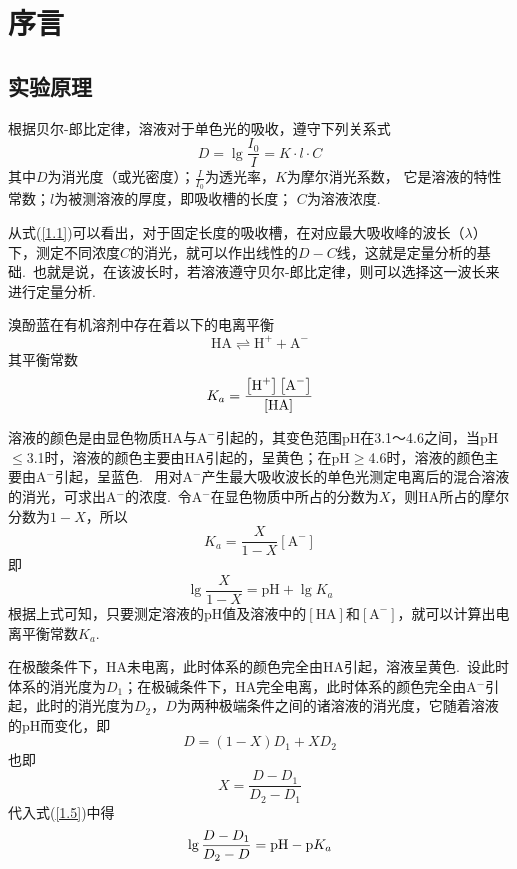 
\chapter{序言}

\section{实验原理\cite{huaxe23}}
根据贝尔-郎比定律，溶液对于单色光的吸收，遵守下列关系式
\begin{equation}\label{1.1}
  D=\lg\frac{I_0}{I}=K\cdot l\cdot C
\end{equation}
其中$D$为消光度（或光密度）；$\frac{I}{I_0}$为透光率，$K$为摩尔消光系数，
它是溶液的特性常数；$l$为被测溶液的厚度，即吸收槽的长度；
$C$为溶液浓度.~

从式(\ref{1.1})可以看出，对于固定长度的吸收槽，在对应最大吸收峰的波长（$\lambda$）下，测定不同浓度$C$的消光，就可以作出线性的$D-C$线，这就是定量分析的基础.~也就是说，在该波长时，若溶液遵守贝尔-郎比定律，则可以选择这一波长来进行定量分析.~

溴酚蓝在有机溶剂中存在着以下的电离平衡
\begin{equation}
  \text{HA}\rightleftharpoons \text{H}^++\text{A}^-
\end{equation}
其平衡常数
\begin{equation}
  K_a=\frac{\left[\text H^+\right]\left[\text A^-\right]}{\left[\text{HA}\right]}
\end{equation}

溶液的颜色是由显色物质HA与$\text{A}^-$引起的，其变色范围pH在3.1～4.6之间，当pH$\leqslant $3.1时，溶液的颜色主要由HA引起的，呈黄色；在pH$\geqslant $4.6时，溶液的颜色主要由A$^-$引起，呈蓝色.~
用对A$^-$产生最大吸收波长的单色光测定电离后的混合溶液的消光，可求出A$^-$的浓度.~令A$^-$在显色物质中所占的分数为$X$，则HA所占的摩尔分数为$1-X$，所以
\begin{equation}
  K_a=\frac{X}{1-X}\left[\text{A}^-\right]
\end{equation}
即
\begin{equation}\label{1.5}
  \lg\frac{X}{1-X}=\text{pH}+\lg K_a
\end{equation}
根据上式可知，只要测定溶液的pH值及溶液中的$\left[\text{HA}\right]$和$\left[\text{A}^-\right]$，就可以计算出电离平衡常数$K_a$.~

在极酸条件下，HA未电离，此时体系的颜色完全由HA引起，溶液呈黄色.~设此时体系的消光度为$D_1$；在极碱条件下，HA完全电离，此时体系的颜色完全由A$^-$引起，此时的消光度为$D_2$，$D$为两种极端条件之间的诸溶液的消光度，它随着溶液的pH而变化，即
\begin{equation}
  D=\left(1-X\right)D_1+XD_2
\end{equation}
也即
\begin{equation}
  X=\frac{D-D_1}{D_2-D_1}
\end{equation}
代入式(\ref{1.5})中得
\begin{equation}
  \lg\frac{D-D_1}{D_2-D}=\text{pH}-\text pK_a
\end{equation}

